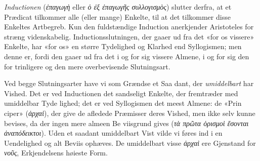 \documentclass[12pt,a4paper]{book}
\newcommand{\gk}[1]{\textit{#1}}
\begin{document}
\emph{Inductionen} (\gk{ἐπαγωγὴ} eller \gk{ὁ ἐξ ἐπαγωγῆς συλλογισμὸς})
slutter derfra, at et Prædicat tilkommer alle (eller mange)
Enkelte, til at det tilkommer disse Enkeltes Artbegreb. Kun
den fuldstændige Induction anerkjender Aristoteles for stræng
videnskabelig. Inductionsslutningen, der gaaer ud fra det
«for os vissere» Enkelte, har «for os» en større Tydelighed
og Klarhed end Syllogismen; men denne er, fordi den gaaer
ud fra det i og for sig vissere Almene, i og for sig den for\-%
trinligere og den mere overbevisende Slutningsart.

Ved begge Slutningsarter have vi som Grændse et Saa\-%
dant, der \emph{umiddelbart} har Vished. Det er ved Inductionen
det sandseligt Enkelte, der fremtræder med umiddelbar Tyde\-%
lighed; det er ved Syllogismen det meest Almene: de «Prin\-%
ciper» (\gk{ἀρχαὶ}), der give de afledede Præmisser deres Vished,
men ikke selv kunne bevises, da der ingen mere almeen Be\-%
viisgrund gives (\gk{τὰ πρῶτα ὁρισμοὶ ἔσονται ἀναπόδεικτοι}).
Uden et saadant umiddelbart Vist vilde vi føres ind i en
Uendelighed og alt Beviis ophæves. De umiddelbart visse
\gk{ἀρχαὶ} ere Gjenstand for \gk{νοῦς}, Erkjendelsens høieste Form.
\end{document}
